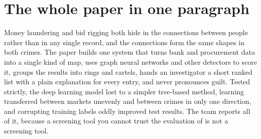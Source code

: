 \documentclass[11pt,a4paper]{article}
\begin{document}
\section*{The whole paper in one paragraph}

Money laundering and bid rigging both hide in the connections between people
rather than in any single record, and the connections form the same shapes in
both crimes. The paper builds one system that turns bank and procurement data
into a single kind of map, uses graph neural networks and other detectors to
score it, groups the results into rings and cartels, hands an investigator a
short ranked list with a plain explanation for every entry, and never
pronounces guilt. Tested strictly, the deep learning model lost to a simpler
tree-based method, learning transferred between markets unevenly and between
crimes in only one direction, and corrupting training labels oddly improved
test results. The team reports all of it, because a screening tool you cannot
trust the evaluation of is not a screening tool.
\end{document}
